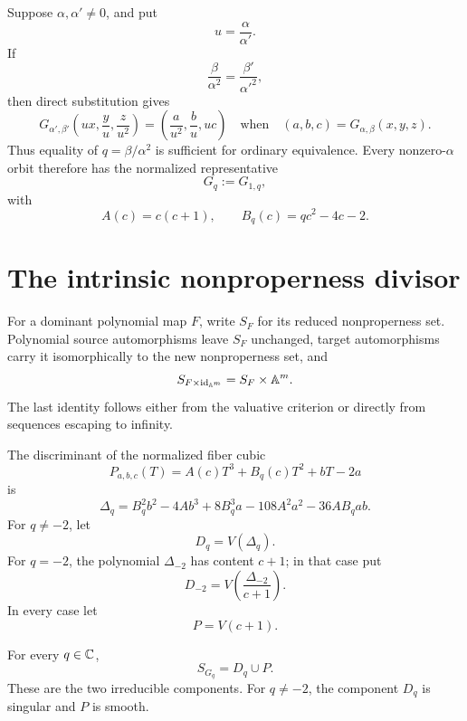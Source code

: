 \documentclass[11pt,reqno]{amsart}
\begin{document}
Suppose \(\alpha,\alpha'\ne0\), and put
\[
u=\frac{\alpha}{\alpha'}.
\]
If
\[
\frac{\beta}{\alpha^2}=\frac{\beta'}{\alpha'^2},
\]
then direct substitution gives
\begin{equation}
\label{eq:diagonal-equivalence}
G_{\alpha',\beta'}
\left(ux,\frac yu,\frac z{u^2}\right)
=
\left(\frac a{u^2},\frac bu,uc\right)
\quad\text{when}\quad
(a,b,c)=G_{\alpha,\beta}(x,y,z).
\end{equation}
Thus equality of \(q=\beta/\alpha^2\) is sufficient for ordinary
equivalence.  Every nonzero-\(\alpha\) orbit therefore has the normalized
representative
\[
G_q:=G_{1,q},
\]
with
\begin{equation}
\label{eq:AB-normalized}
A(c)=c(c+1),\qquad B_q(c)=qc^2-4c-2.
\end{equation}

\section{The intrinsic nonproperness divisor}
\label{sec:nonproperness}

For a dominant polynomial map \(F\), write \(S_F\) for its reduced
nonproperness set.  Polynomial source automorphisms leave \(S_F\) unchanged,
target automorphisms carry it isomorphically to the new nonproperness set,
and
\begin{equation}
\label{eq:cylinder-NP}
S_{F\times\operatorname{id}_{\mathbb A^m}}=S_F\times\mathbb A^m.
\end{equation}
The last identity follows either from the valuative criterion or directly
from sequences escaping to infinity.

The discriminant of the normalized fiber cubic
\[
P_{a,b,c}(T)=A(c)T^3+B_q(c)T^2+bT-2a
\]
is
\begin{equation}
\label{eq:Delta}
\Delta_q=
B_q^2b^2-4Ab^3+8B_q^3a
-108A^2a^2-36AB_qab.
\end{equation}
For \(q\ne-2\), let
\[
D_q=V(\Delta_q).
\]
For \(q=-2\), the polynomial \(\Delta_{-2}\) has content \(c+1\); in that
case put
\[
D_{-2}=V\left(\frac{\Delta_{-2}}{c+1}\right).
\]
In every case let
\[
P=V(c+1).
\]

\begin{proposition}
\label{prop:NP}
For every \(q\in\mathbb C\),
\[
S_{G_q}=D_q\cup P.
\]
These are the two irreducible components.  For \(q\ne-2\), the component
\(D_q\) is singular and \(P\) is smooth.
\end{proposition}
\end{document}
